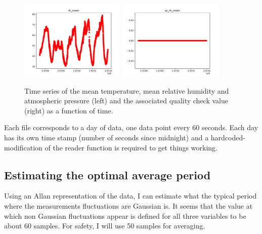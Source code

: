 \documentclass[11pt]{amsart}
\begin{document}
\begin{figure}
    \includegraphics[width=0.45\textwidth]{../plots/rh_mean.pdf}
    \includegraphics[width=0.45\textwidth]{../plots/qc_rh_mean.pdf}
    \caption{Time series of the mean temperature, mean relative humidity and atmospheric pressure (left) and the associated quality check value (right) as a function of time.}
\end{figure}

Each file corresponds to a day of data, one data point every 60 seconds.
Each day has its own time stamp (number of seconds since midnight) and a hardcoded-modification of the reader function is required to get things working.

\subsection{Estimating the optimal average period}

Using an Allan representation of the data, I can estimate what the typical period where the measurements fluctuations are Gaussian is.
It seems that the value at which non Gaussian fluctuations appear is defined for all three variables to be about 60 samples.
For safety, I will use 50 samples for averaging.
\end{document}
